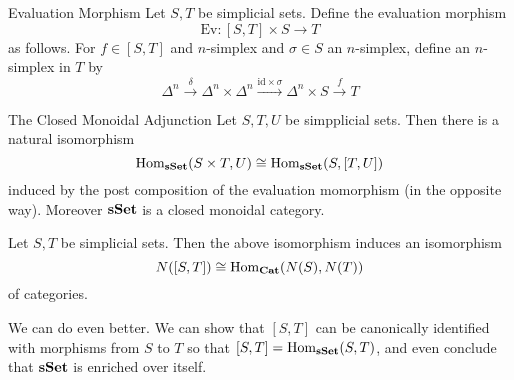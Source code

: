 \documentclass[a4paper]{article}
\begin{document}
\begin{defn}{Evaluation Morphism}{} Let $S,T$ be simplicial sets. Define the evaluation morphism $$\text{Ev}:[S,T]\times S\to T$$ as follows. For $f\in[S,T]$ and $n$-simplex and $\sigma\in S$ an $n$-simplex, define an $n$-simplex in $T$ by $$\Delta^n\overset{\delta}{\rightarrow}\Delta^n\times\Delta^n\overset{\text{id}\times\sigma}{\rightarrow}\Delta^n\times S\overset{f}{\rightarrow}T$$
\end{defn}

\begin{thm}{The Closed Monoidal Adjunction}{} Let $S,T,U$ be simpplicial sets. Then there is a natural isomorphism $$\operatorname{Hom}_\bold{sSet}(S\times T,U)\cong\operatorname{Hom}_\bold{sSet}(S,[T,U])$$ induced by the post composition of the evaluation momorphism (in the opposite way). Moreover $\bold{sSet}$ is a closed monoidal category. 
\end{thm}

\begin{prp}{}{} Let $S,T$ be simplicial sets. Then the above isomorphism induces an isomorphism $$N([S,T])\cong\operatorname{Hom}_\bold{Cat}(N(S),N(T))$$ of categories. 
\end{prp}

We can do even better. We can show that $[S,T]$ can be canonically identified with morphisms from $S$ to $T$ so that $[S,T]=\operatorname{Hom}_\bold{sSet}(S,T)$, and even conclude that $\bold{sSet}$ is enriched over itself. 
\end{document}
